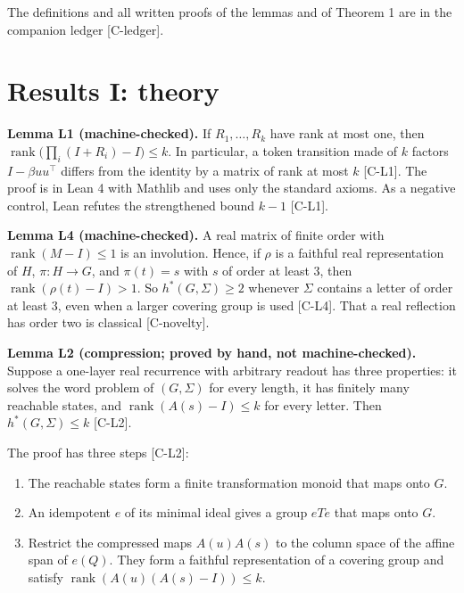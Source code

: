 \documentclass[10pt,twocolumn,a4paper]{article}
\providecommand{\tightlist}{\setlength{\itemsep}{0pt}\setlength{\parskip}{0pt}}
\begin{document}
The definitions and all written proofs of the lemmas and of Theorem 1 are in the companion ledger {[}C-ledger{]}.

\section{Results I: theory}\label{results-i-theory}

\textbf{Lemma L1 (machine-checked).} If \(R_1,\dots,R_k\) have rank at most one, then \(\operatorname{rank}\big(\prod_i (I+R_i) - I\big) \le k\). In particular, a token transition made of \(k\) factors \(I - \beta u u^\top\) differs from the identity by a matrix of rank at most \(k\) {[}C-L1{]}. The proof is in Lean 4 with Mathlib and uses only the standard axioms. As a negative control, Lean refutes the strengthened bound \(k-1\) {[}C-L1{]}.

\textbf{Lemma L4 (machine-checked).} A real matrix of finite order with \(\operatorname{rank}(M-I) \le 1\) is an involution. Hence, if \(\rho\) is a faithful real representation of \(H\), \(\pi: H \to G\), and \(\pi(t) = s\) with \(s\) of order at least \(3\), then \(\operatorname{rank}(\rho(t) - I) > 1\). So \(h^*(G,\Sigma) \ge 2\) whenever \(\Sigma\) contains a letter of order at least \(3\), even when a larger covering group is used {[}C-L4{]}. That a real reflection has order two is classical {[}C-novelty{]}.

\textbf{Lemma L2 (compression; proved by hand, not machine-checked).} Suppose a one-layer real recurrence with arbitrary readout has three properties: it solves the word problem of \((G,\Sigma)\) for every length, it has finitely many reachable states, and \(\operatorname{rank}(A(s)-I) \le k\) for every letter. Then \(h^*(G,\Sigma) \le k\) {[}C-L2{]}.

The proof has three steps {[}C-L2{]}:

\begin{enumerate}
\def\labelenumi{\arabic{enumi}.}
\tightlist
\item
  The reachable states form a finite transformation monoid that maps onto \(G\).
\item
  An idempotent \(e\) of its minimal ideal gives a group \(eTe\) that maps onto \(G\).
\item
  Restrict the compressed maps \(A(u)A(s)\) to the column space of the affine span of \(e(Q)\). They form a faithful representation of a covering group and satisfy \(\operatorname{rank}(A(u)(A(s)-I)) \le k\).
\end{enumerate}
\end{document}
